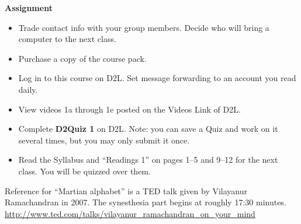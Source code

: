 {\bf Assignment}
\begin{itemize}
\item  Trade contact info with your group members.  Decide who will
  bring a computer to the next class.
\item   Purchase a copy of the course pack.
\item   Log in to this course on D2L. Set message forwarding to an
  account you read daily.
\item View videos 1a through 1e posted on the Videos Link of D2L.
\item  Complete {\bf D2Quiz 1} on D2L.  Note: you can save a Quiz and
  work on it several times, but you may only submit it once. %
\item Read the Syllabus and ``Readings 1'' on pages 1--5 and 9--12 for
  the next class. You will be quizzed over them. 
\end{itemize}


Reference for ``Martian alphabet'' is a TED talk given by Vilayanur
Ramachandran in 2007. The synesthesia part begins at roughly 17:30 minutes.
\url{http://www.ted.com/talks/vilayanur_ramachandran_on_your_mind}